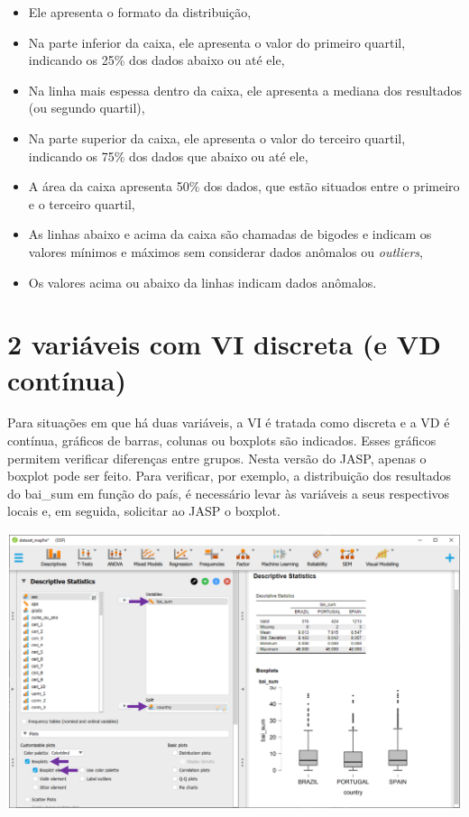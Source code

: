 \documentclass[
]{book}
\providecommand{\tightlist}{%
  \setlength{\itemsep}{0pt}\setlength{\parskip}{0pt}}
\begin{document}
\begin{itemize}
\tightlist
\item
  Ele apresenta o formato da distribuição,\\
\item
  Na parte inferior da caixa, ele apresenta o valor do primeiro quartil, indicando os 25\% dos dados abaixo ou até ele,\\
\item
  Na linha mais espessa dentro da caixa, ele apresenta a mediana dos resultados (ou segundo quartil),\\
\item
  Na parte superior da caixa, ele apresenta o valor do terceiro quartil, indicando os 75\% dos dados que abaixo ou até ele,\\
\item
  A área da caixa apresenta 50\% dos dados, que estão situados entre o primeiro e o terceiro quartil,\\
\item
  As linhas abaixo e acima da caixa são chamadas de bigodes e indicam os valores mínimos e máximos sem considerar dados anômalos ou \emph{outliers},\\
\item
  Os valores acima ou abaixo da linhas indicam dados anômalos.
\end{itemize}

\hypertarget{variuxe1veis-com-vi-discreta-e-vd-contuxednua-1}{%
\section{2 variáveis com VI discreta (e VD contínua)}\label{variuxe1veis-com-vi-discreta-e-vd-contuxednua-1}}

Para situações em que há duas variáveis, a VI é tratada como discreta e a VD é contínua, gráficos de barras, colunas ou boxplots são indicados. Esses gráficos permitem verificar diferenças entre grupos. Nesta versão do JASP, apenas o boxplot pode ser feito. Para verificar, por exemplo, a distribuição dos resultados do bai\_sum em função do país, é necessário levar às variáveis a seus respectivos locais e, em seguida, solicitar ao JASP o boxplot.

\includegraphics{./img/cap_desc_jasp_grafico_boxplot_grupo.png}
\end{document}
